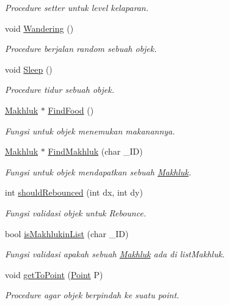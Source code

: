 \begin{DoxyCompactItemize}
\begin{DoxyCompactList}\small\item\em Procedure setter untuk level kelaparan. \end{DoxyCompactList}\item 
void \hyperlink{class_hewan_a8268bfb533b9becb62e2bd8eee2e7960}{Wandering} ()
\begin{DoxyCompactList}\small\item\em Procedure berjalan random sebuah objek. \end{DoxyCompactList}\item 
void \hyperlink{class_hewan_ad1ba348d0912e3e392e41ae0c197c69b}{Sleep} ()
\begin{DoxyCompactList}\small\item\em Procedure tidur sebuah objek. \end{DoxyCompactList}\item 
\hyperlink{class_makhluk}{Makhluk} $\ast$ \hyperlink{class_hewan_ab604462c6b9c235f9d53d42235acd41b}{Find\+Food} ()
\begin{DoxyCompactList}\small\item\em Fungsi untuk objek menemukan makanannya. \end{DoxyCompactList}\item 
\hyperlink{class_makhluk}{Makhluk} $\ast$ \hyperlink{class_hewan_a7d89c8d0bee799698b986159c67f6bb3}{Find\+Makhluk} (char \+\_\+\+ID)
\begin{DoxyCompactList}\small\item\em Fungsi untuk objek mendapatkan sebuah \hyperlink{class_makhluk}{Makhluk}. \end{DoxyCompactList}\item 
int \hyperlink{class_hewan_af4ae28e9179a2438a666b26e1882139d}{should\+Rebounced} (int dx, int dy)
\begin{DoxyCompactList}\small\item\em Fungsi validasi objek untuk Rebounce. \end{DoxyCompactList}\item 
bool \hyperlink{class_hewan_a3798162fd7aa8cfef947abce00c283ef}{is\+Makhlukin\+List} (char \+\_\+\+ID)
\begin{DoxyCompactList}\small\item\em Fungsi validasi apakah sebuah \hyperlink{class_makhluk}{Makhluk} ada di list\+Makhluk. \end{DoxyCompactList}\item 
void \hyperlink{class_hewan_a5420deb2ff65c6cedd5c80f1f3d42d00}{get\+To\+Point} (\hyperlink{class_point}{Point} P)
\begin{DoxyCompactList}\small\item\em Procedure agar objek berpindah ke suatu point. \end{DoxyCompactList}\end{DoxyCompactItemize}
